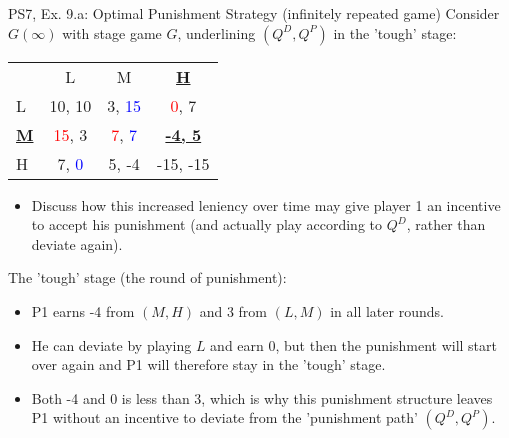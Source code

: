 \begin{frame}{PS7, Ex. 9.a: Optimal Punishment Strategy (infinitely repeated game)}
    Consider $G(\infty)$ with stage game $G$, underlining $(Q^D,Q^P)$ in the 'tough' stage: \vspace{-6pt}
    \begin{table}
      \begin{tabular}{l|c|c|c|}
        \multicolumn{1}{c}{} & \multicolumn{1}{c}{L} & \multicolumn{1}{c}{M} & \multicolumn{1}{c}{\textbf{\underline{H}}} \\\cline{2-4}
        L & 10, 10 & 3, \textcolor{blue}{15} & \textcolor{red}{0}, 7 \\\cline{2-4}
        \textbf{\underline{M}} & \textcolor{red}{15}, 3 & \textcolor{red}{7}, \textcolor{blue}{7} & \textbf{\underline{-4, 5}} \\\cline{2-4}
        H & 7, \textcolor{blue}{0} & 5, -4 & -15, -15 \\\cline{2-4}
      \end{tabular}
    \end{table}
    \vspace{-4pt}
    \begin{itemize}
      \item[(a)] Discuss how this increased leniency over time may give player 1 an incentive to accept his punishment (and actually play according to $Q^D$, rather than deviate again).
    \end{itemize}
    \vspace{-8pt}
  \begin{multicols}{2}
    The 'tough' stage (the  round of punishment):\vspace{-4pt}
    \begin{itemize}
      \item P1 earns -4 from $(M, H)$ and 3 from $(L, M)$ in all later rounds.
      \item He can deviate by playing $L$ and earn 0, but then the punishment will start over again and P1 will therefore stay in the 'tough' stage.
      \item Both -4 and 0 is less than 3, which is why this punishment structure leaves P1 without an incentive to deviate from the 'punishment path' $(Q^D,Q^P)$.
    \end{itemize}
    \vfill\null\columnbreak
    \vfill\null
  \end{multicols}
\end{frame}
